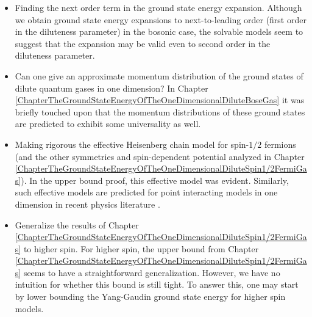 \begin{itemize}
	\item Finding the next order term in the ground state energy expansion. Although we obtain ground state energy expansions to next-to-leading order (first order in the diluteness parameter) in the bosonic case, the solvable models seem to suggest that the expansion may be valid even to second order in the diluteness parameter.
	\item Can one give an approximate momentum distribution of the ground states of dilute quantum gases in one dimension? In Chapter \ref{ChapterTheGroundStateEnergyOfTheOneDimensionalDiluteBoseGas} it was briefly touched upon that the momentum distributions of these ground states are predicted to exhibit some universality as well.
	\item Making rigorous the effective Heisenberg chain model for spin-$ 1/2$ fermions (and the other symmetries and spin-dependent potential analyzed in Chapter \ref{ChapterTheGroundStateEnergyOfTheOneDimensionalDiluteSpin1/2FermiGas}). In the upper bound proof, this effective model was evident. Similarly, such effective models are predicted for point interacting models in one dimension in recent physics literature \cite{yang2016effective,volosniev2015engineering}.
	\item Generalize the results of Chapter \ref{ChapterTheGroundStateEnergyOfTheOneDimensionalDiluteSpin1/2FermiGas} to higher spin. For higher spin, the upper bound from Chapter \ref{ChapterTheGroundStateEnergyOfTheOneDimensionalDiluteSpin1/2FermiGas} seems to have a straightforward generalization. However, we have no intuition for whether this bound is still tight. To answer this, one may start by lower bounding the Yang-Gaudin ground state energy for higher spin models.
\end{itemize}



